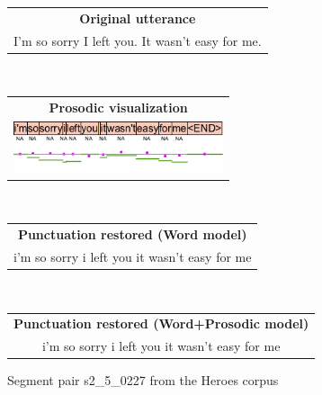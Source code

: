 \begin{figure}[h]
    \centering
    \begin{tabular}{c}
    \textbf{Original utterance}\\
    I'm so sorry I left you. It wasn't easy for me. \\
    \end{tabular}
    \\
    \begin{tabular}{c}
    \textbf{Prosodic visualization}\\
    \includegraphics[height=1.5cm]{img/s2_5_0227-EN.png} \\
    \end{tabular}
    \\
    \begin{tabular}{c}
    \textbf{Punctuation restored (Word model)}\\
    i'm so sorry i left you\mycirc{\textbf{.}} it wasn't easy for me \\
    \end{tabular}
    \\
    \begin{tabular}{c}
    \textbf{Punctuation restored (Word+Prosodic model)}\\
    i'm so sorry i left you\mycirc{\textbf{.}} it wasn't easy for me \\
    \end{tabular}
    \caption{Segment pair s2\_5\_0227 from the Heroes corpus}
    \label{figure:heroes_pp_1}
\end{figure}
\hfill
